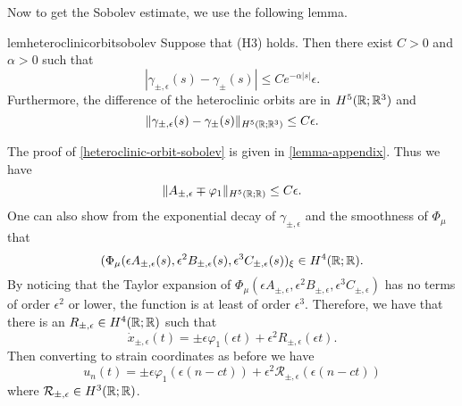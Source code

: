 Now to get the Sobolev estimate, we use the following lemma.
\begin{restatable}{lem}{heteroclinicorbitsobolev}\label{heteroclinic-orbit-sobolev}
	Suppose that (H3) holds. Then there exist \(C> 0\) and \(\alpha > 0\) such that
	\begin{equation}
		| \gamma_{\pm, \epsilon}(s) - \gamma_{\pm}(s) | \leq C e^{-\alpha| s|} \epsilon.
	\end{equation}
	Furthermore, the difference of the heteroclinic orbits are in \(H^5(\mathbb{R}; \mathbb{R}^3)\) and 
	\begin{equation}
		\| \gamma_{\pm, \epsilon}(s) - \gamma_{\pm}(s) \|_{H^5(\mathbb{R};\mathbb{R}^3)}  \leq C \epsilon.
	\end{equation}
\end{restatable}
The proof of \cref{heteroclinic-orbit-sobolev} is given in \cref{lemma-appendix}. Thus we have
\begin{equation}
	\|A_{\pm, \epsilon} \mp \varphi_{1}\|_{H^5(\mathbb{R};\mathbb{R})} \leq C \epsilon.
\end{equation}
One can also show from the exponential decay of \(\gamma_{\pm, \epsilon}\) and the smoothness of \(\Phi_\mu\) that
\begin{equation}
	(\Phi_\mu(\epsilon A_{\pm, \epsilon}(s),\epsilon^2 B_{\pm, \epsilon}(s) ,\epsilon^3 C_{\pm, \epsilon}(s))_\xi \in H^4(\mathbb{R};\mathbb{R}).
\end{equation}
By noticing that the Taylor expansion of \(\Phi_\mu(\epsilon A_{\pm, \epsilon}, \epsilon^2 B_{\pm, \epsilon}, \epsilon^3 C_{\pm, \epsilon})\) has no terms of order \(\epsilon^2\) or lower, the function is at least of order \(\epsilon^3\). Therefore, we have that there is an \(R_{\pm,\epsilon} \in H^4(\mathbb{R};\mathbb{R})\) such that
\begin{equation}
	\dot x_{\pm, \epsilon }(t) = \pm \epsilon\varphi_1(\epsilon t) + \epsilon^2 R_{\pm,\epsilon}(\epsilon t).
\end{equation}
Then converting to strain coordinates as before we have
\begin{equation}
	u_n(t) = \pm\epsilon\varphi_1(\epsilon(n-ct)) + \epsilon^2 \mathcal R_{\pm, \epsilon}(\epsilon(n-ct))
\end{equation}
where \(\mathcal R_{\pm, \epsilon} \in H^3(\mathbb{R};\mathbb{R})\).

